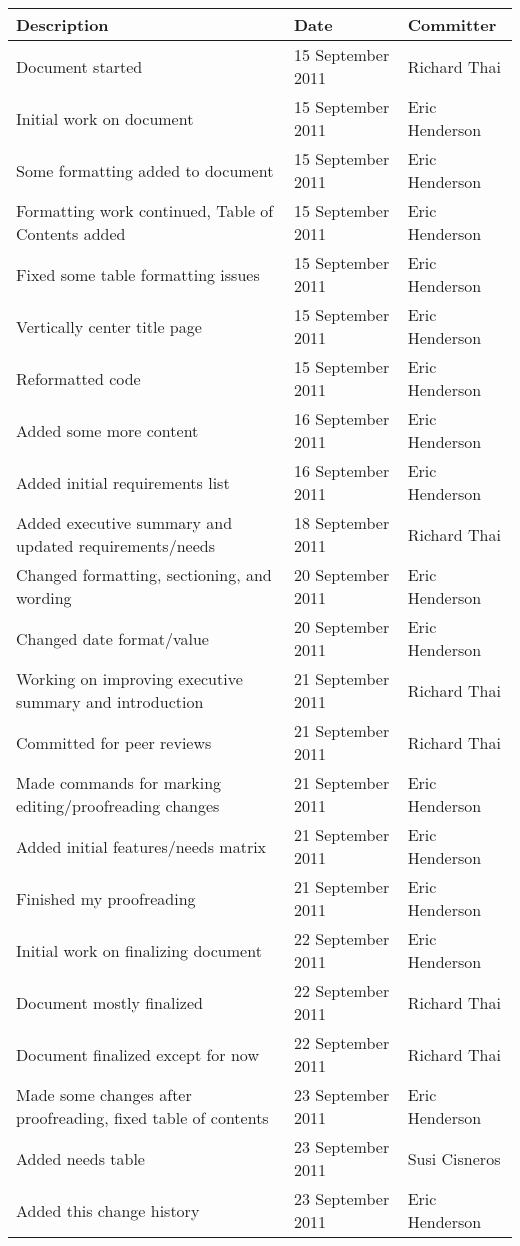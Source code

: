 \documentclass{article}
\begin{document}
\begin{tabular}{ | p{3.75in} | p{1.5in} | p{1.25in} | }
\hline
\textbf{Description} & \textbf{Date} & \textbf{Committer}\\
\hline
\hline
Document started & 15 September 2011 & Richard Thai\\
\hline
Initial work on document & 15 September 2011 & Eric Henderson\\
\hline
Some formatting added to document & 15 September 2011 & Eric Henderson\\
\hline
Formatting work continued, Table of Contents added & 15 September 2011 & Eric Henderson\\
\hline
Fixed some table formatting issues & 15 September 2011 & Eric Henderson\\
\hline
Vertically center title page & 15 September 2011 & Eric Henderson\\
\hline
Reformatted code & 15 September 2011 & Eric Henderson\\
\hline
Added some more content & 16 September 2011 & Eric Henderson\\
\hline
Added initial requirements list & 16 September 2011 & Eric Henderson\\
\hline
Added executive summary and updated requirements/needs & 18 September 2011 & Richard Thai\\
\hline
Changed formatting, sectioning, and wording & 20 September 2011 & Eric Henderson\\
\hline
Changed date format/value & 20 September 2011 & Eric Henderson\\
\hline
Working on improving executive summary and introduction & 21 September 2011 & Richard Thai\\
\hline
Committed for peer reviews & 21 September 2011 & Richard Thai\\
\hline
Made commands for marking editing/proofreading changes & 21 September 2011 & Eric Henderson\\
\hline
Added initial features/needs matrix & 21 September 2011 & Eric Henderson\\
\hline
Finished my proofreading & 21 September 2011 & Eric Henderson\\
\hline
Initial work on finalizing document & 22 September 2011 & Eric Henderson\\
\hline
Document mostly finalized & 22 September 2011 & Richard Thai\\
\hline
Document finalized except for now & 22 September 2011 & Richard Thai\\
\hline
Made some changes after proofreading, fixed table of contents & 23 September 2011 & Eric Henderson\\
\hline
Added needs table & 23 September 2011 & Susi Cisneros\\
\hline
Added this change history & 23 September 2011 & Eric Henderson\\
\hline
\end{tabular}
\clearpage
\end{document}
